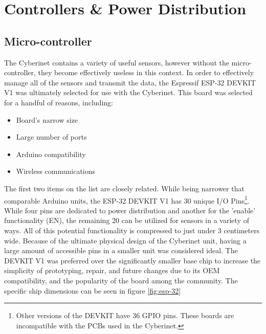 \section{Controllers \& Power Distribution}

\subsection{Micro-controller}
The Cyberinet contains a variety of useful sensors, however without the micro-controller, they become effectively useless in this context. In order to effectively manage all of the sensors and transmit the data, the Espressif ESP-32 DEVKIT V1 was ultimately selected for use with the Cyberinet. This board was selected for a handful of reasons, including:

\begin{itemize}
    \item Board's narrow size
    \item Large number of ports
    \item Arduino compatibility
    \item Wireless communications
\end{itemize}

The first two items on the list are closely related. While being narrower that comparable Arduino units, the ESP-32 DEVKIT V1 has 30 unique I/O Pins\footnote{Other versions of the DEVKIT have 36 GPIO pins. These boards are incompatible with the PCBs used in the Cyberinet.}. While four pins are dedicated to power distribution and another for the 'enable' functionality (EN), the remaining 20 can be utilized for sensors in a variety of ways. All of this potential functionality is compressed to just under 3 centimeters wide. Because of the ultimate physical design of the Cyberinet unit, having a large amount of accessible pins in a smaller unit was considered ideal. The DEVKIT V1 was preferred over the significantly smaller base chip to increase the simplicity of prototyping, repair, and future changes due to its OEM compatibility, and the popularity of the board among the community. The specific ship dimensions can be seen in figure \ref{fig:esp-32}

